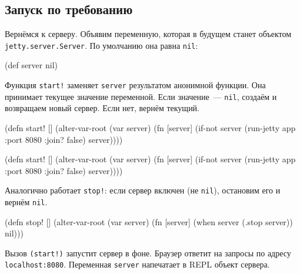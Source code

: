 \subsection{Запуск по требованию}

Вернёмся к серверу. Объявим переменную, которая в будущем станет объектом
\texttt{jetty.server\-.Server}. По умолчанию она равна \verb|nil|:

\begin{english}
  \begin{clojure}
(def server nil)
  \end{clojure}
\end{english}

Функция \verb|start!| заменяет \verb|server| результатом анонимной функции. Она
принимает текущее значение переменной. Если значение~--- \verb|nil|, создаём и
возвращаем новый сервер. Если нет, вернём текущий.

\ifnarrow

\begin{english}
  \begin{clojure}
(defn start! []
  (alter-var-root
   (var server)
   (fn [server]
     (if-not server
       (run-jetty app {:port 8080
                       :join? false})
       server))))
  \end{clojure}
\end{english}

\else

\begin{english}
  \begin{clojure}
(defn start! []
  (alter-var-root
   (var server)
   (fn [server]
     (if-not server
       (run-jetty app {:port 8080 :join? false})
       server))))
  \end{clojure}
\end{english}

\fi

\noindent
Аналогично работает \verb|stop!|: если сервер включен (не \verb|nil|),
остановим его и вернём \verb|nil|.

\begin{english}
  \begin{clojure}
(defn stop! []
  (alter-var-root
   (var server)
   (fn [server]
     (when server
       (.stop server))
     nil)))
  \end{clojure}
\end{english}

\mnoindent
Вызов \verb|(start!)| запустит сервер в фоне. Браузер ответит на запросы по
адресу \texttt{localhost\-:8080}. Переменная \verb|server| напечатает в REPL
объект сервера.

